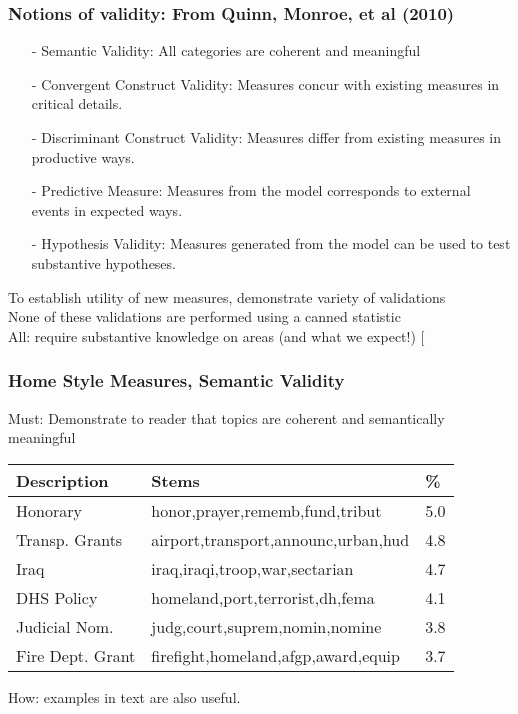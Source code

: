 \documentclass{beamer}
\numberwithin{equation}{section}
\begin{document}
\begin{frame}
\frametitle{Notions of validity: From Quinn, Monroe, et al (2010) }

\begin{enumerate}
\item[-] \alert{Semantic Validity:} All categories are coherent and meaningful
\item[-] \alert{Convergent Construct Validity:} Measures concur with existing measures in critical details.
\item[-]  \alert{Discriminant Construct Validity}: Measures differ from existing measures in productive ways.
\item[-] \alert{Predictive Measure:} Measures from the model corresponds to external events in expected ways.
\item[-] \alert{Hypothesis Validity:} Measures generated from the model can be used to test substantive hypotheses.
\end{enumerate}

To establish utility of new measures, demonstrate variety of \alert{validations}\\
\alert{None of these validations are performed using a canned statistic}\\
\alert{All}: require substantive knowledge on areas (and what we expect!) [

\end{frame}


\begin{frame}
\frametitle{Home Style Measures, Semantic Validity}


\alert{Must}: Demonstrate to reader that topics are coherent and semantically meaningful

\begin{tabular}{lll}
\hline\hline
Description & Stems & \% \\
\hline
Honorary& honor,prayer,rememb,fund,tribut& 5.0\\
Transp. Grants& airport,transport,announc,urban,hud&4.8\\
Iraq& iraq,iraqi,troop,war,sectarian& 4.7\\
DHS Policy& homeland,port,terrorist,dh,fema&4.1\\
Judicial Nom.& judg,court,suprem,nomin,nomine&3.8\\
Fire Dept. Grant& firefight,homeland,afgp,award,equip&3.7\\
\hline
\end{tabular}

How: \alert{examples} in text are also useful.


\end{frame}
\end{document}
